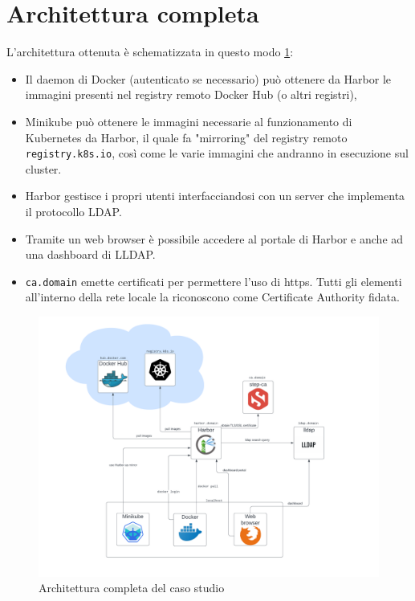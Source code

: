 \documentclass[12pt]{report}
\begin{document}
\section{Architettura completa}
L'architettura ottenuta è schematizzata in questo modo \ref{image:gen-arch}:
\begin{itemize}
    \item Il daemon di Docker (autenticato se necessario) può ottenere da Harbor le immagini presenti nel registry remoto Docker Hub (o altri registri),
    \item Minikube può ottenere le immagini necessarie al funzionamento di Kubernetes da Harbor, il quale fa "mirroring" del registry remoto \texttt{registry.k8s.io}, così come le varie immagini che andranno in esecuzione sul cluster.
    \item Harbor gestisce i propri utenti interfacciandosi con un server che implementa il protocollo LDAP.
    \item Tramite un web browser è possibile accedere al portale di Harbor e anche ad una dashboard di LLDAP.
    \item \texttt{ca.domain} emette certificati per permettere l'uso di https. Tutti gli elementi all'interno della rete locale la riconoscono come Certificate Authority fidata.
\end{itemize}
\begin{figure}[h]
    \centering
    \includegraphics[width=\textwidth]{images/arch-gen.png}
    \caption{Architettura completa del caso studio}
    \label{image:gen-arch}
\end{figure}
\end{document}
